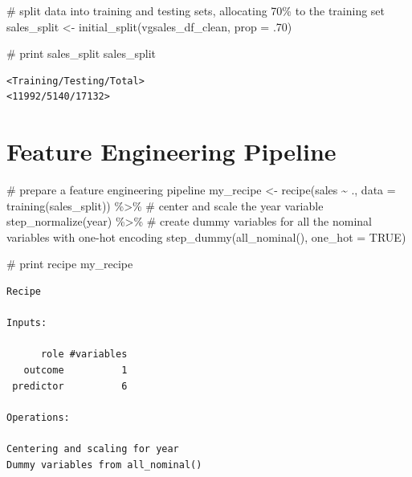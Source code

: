 \documentclass[
  letterpaper,
  DIV=11,
  numbers=noendperiod]{scrartcl}
\newenvironment{Shaded}{\begin{snugshade}}{\end{snugshade}}
\newcommand{\AttributeTok}[1]{\textcolor[rgb]{0.40,0.45,0.13}{#1}}
\newcommand{\CommentTok}[1]{\textcolor[rgb]{0.37,0.37,0.37}{#1}}
\newcommand{\ConstantTok}[1]{\textcolor[rgb]{0.56,0.35,0.01}{#1}}
\newcommand{\DecValTok}[1]{\textcolor[rgb]{0.68,0.00,0.00}{#1}}
\newcommand{\FunctionTok}[1]{\textcolor[rgb]{0.28,0.35,0.67}{#1}}
\newcommand{\NormalTok}[1]{\textcolor[rgb]{0.00,0.23,0.31}{#1}}
\newcommand{\OtherTok}[1]{\textcolor[rgb]{0.00,0.23,0.31}{#1}}
\newcommand{\SpecialCharTok}[1]{\textcolor[rgb]{0.37,0.37,0.37}{#1}}
\begin{document}
\begin{Shaded}
\begin{Highlighting}[]
\CommentTok{\# split data into training and testing sets, allocating 70\% to the training set}
\NormalTok{sales\_split }\OtherTok{\textless{}{-}} \FunctionTok{initial\_split}\NormalTok{(vgsales\_df\_clean, }\AttributeTok{prop =}\NormalTok{ .}\DecValTok{70}\NormalTok{)}

\CommentTok{\# print sales\_split}
\NormalTok{sales\_split}
\end{Highlighting}
\end{Shaded}

\begin{verbatim}
<Training/Testing/Total>
<11992/5140/17132>
\end{verbatim}

\hypertarget{feature-engineering-pipeline}{%
\section{Feature Engineering
Pipeline}\label{feature-engineering-pipeline}}

\begin{Shaded}
\begin{Highlighting}[]
\CommentTok{\# prepare a feature engineering pipeline}
\NormalTok{my\_recipe }\OtherTok{\textless{}{-}} \FunctionTok{recipe}\NormalTok{(sales }\SpecialCharTok{\textasciitilde{}}\NormalTok{ ., }\AttributeTok{data =} \FunctionTok{training}\NormalTok{(sales\_split)) }\SpecialCharTok{\%\textgreater{}\%} 
  \CommentTok{\# center and scale the year variable}
  \FunctionTok{step\_normalize}\NormalTok{(year) }\SpecialCharTok{\%\textgreater{}\%} 
  \CommentTok{\# create dummy variables for all the nominal variables with one{-}hot encoding}
  \FunctionTok{step\_dummy}\NormalTok{(}\FunctionTok{all\_nominal}\NormalTok{(), }\AttributeTok{one\_hot =} \ConstantTok{TRUE}\NormalTok{)}

\CommentTok{\# print recipe}
\NormalTok{my\_recipe}
\end{Highlighting}
\end{Shaded}

\begin{verbatim}
Recipe

Inputs:

      role #variables
   outcome          1
 predictor          6

Operations:

Centering and scaling for year
Dummy variables from all_nominal()
\end{verbatim}
\end{document}
